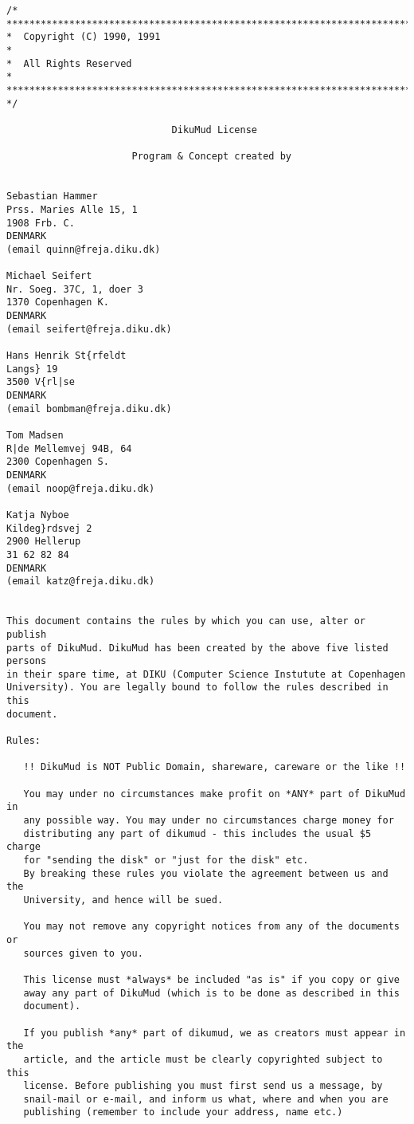 \documentclass[11pt]{article}
\begin{document}
\begin{verbatim}
/* ************************************************************************
*  Copyright (C) 1990, 1991                                               *
*  All Rights Reserved                                                    *
************************************************************************* */

                             DikuMud License

                      Program & Concept created by


Sebastian Hammer
Prss. Maries Alle 15, 1
1908 Frb. C.
DENMARK
(email quinn@freja.diku.dk)

Michael Seifert
Nr. Soeg. 37C, 1, doer 3
1370 Copenhagen K.
DENMARK
(email seifert@freja.diku.dk)

Hans Henrik St{rfeldt
Langs} 19
3500 V{rl|se
DENMARK
(email bombman@freja.diku.dk)

Tom Madsen
R|de Mellemvej 94B, 64
2300 Copenhagen S.
DENMARK
(email noop@freja.diku.dk)

Katja Nyboe
Kildeg}rdsvej 2
2900 Hellerup
31 62 82 84
DENMARK
(email katz@freja.diku.dk)


This document contains the rules by which you can use, alter or publish
parts of DikuMud. DikuMud has been created by the above five listed persons
in their spare time, at DIKU (Computer Science Instutute at Copenhagen
University). You are legally bound to follow the rules described in this
document.

Rules:

   !! DikuMud is NOT Public Domain, shareware, careware or the like !!

   You may under no circumstances make profit on *ANY* part of DikuMud in
   any possible way. You may under no circumstances charge money for
   distributing any part of dikumud - this includes the usual $5 charge
   for "sending the disk" or "just for the disk" etc.
   By breaking these rules you violate the agreement between us and the
   University, and hence will be sued.

   You may not remove any copyright notices from any of the documents or
   sources given to you.

   This license must *always* be included "as is" if you copy or give
   away any part of DikuMud (which is to be done as described in this
   document).

   If you publish *any* part of dikumud, we as creators must appear in the
   article, and the article must be clearly copyrighted subject to this
   license. Before publishing you must first send us a message, by
   snail-mail or e-mail, and inform us what, where and when you are
   publishing (remember to include your address, name etc.)


\end{verbatim}
\end{document}

